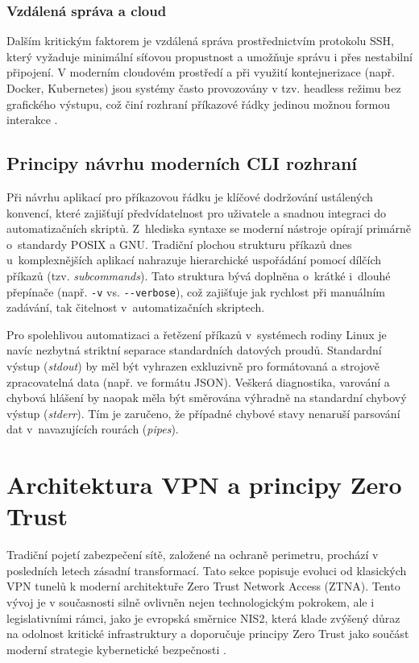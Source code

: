 \subsubsection{Vzdálená správa a cloud}
Dalším kritickým faktorem je vzdálená správa prostřednictvím protokolu SSH, který vyžaduje minimální síťovou propustnost a umožňuje správu i přes nestabilní připojení. V moderním cloudovém prostředí a při využití kontejnerizace (např. Docker, Kubernetes) jsou systémy často provozovány v tzv. headless režimu bez grafického výstupu, což činí rozhraní příkazové řádky jedinou možnou formou interakce \cite{ward_linux}.

\subsection{Principy návrhu moderních CLI rozhraní}

Při návrhu aplikací pro příkazovou řádku je klíčové dodržování ustálených konvencí, které zajišťují předvídatelnost pro uživatele a snadnou integraci do automatizačních skriptů. Z~hlediska syntaxe se moderní nástroje opírají primárně o~standardy POSIX a GNU. Tradiční plochou strukturu příkazů dnes u~komplexnějších aplikací nahrazuje hierarchické uspořádání pomocí dílčích příkazů (tzv. \textit{subcommands}). Tato struktura bývá doplněna o~krátké i~dlouhé přepínače (např. \texttt{-v} vs. \texttt{-{}-verbose}), což zajišťuje jak rychlost při manuálním zadávání, tak čitelnost v~automatizačních skriptech.

Pro spolehlivou automatizaci a řetězení příkazů v~systémech rodiny Linux je navíc nezbytná striktní separace standardních datových proudů. Standardní výstup (\textit{stdout}) by měl být vyhrazen exkluzivně pro formátovaná a strojově zpracovatelná data (např. ve formátu JSON). Veškerá diagnostika, varování a chybová hlášení by naopak měla být směrována výhradně na standardní chybový výstup (\textit{stderr}). Tím je zaručeno, že případné chybové stavy nenaruší parsování dat v~navazujících rourách (\textit{pipes}).

\section{Architektura VPN a principy Zero Trust}
\label{sec:vpn_zero_trust}
Tradiční pojetí zabezpečení sítě, založené na ochraně perimetru, prochází v posledních letech zásadní transformací. Tato sekce popisuje evoluci od klasických VPN tunelů k moderní architektuře Zero Trust Network Access (ZTNA). Tento vývoj je v současnosti silně ovlivněn nejen technologickým pokrokem, ale i legislativními rámci, jako je evropská směrnice NIS2, která klade zvýšený důraz na odolnost kritické infrastruktury a doporučuje principy Zero Trust jako součást moderní strategie kybernetické bezpečnosti \cite{goodaccess_ztna_explained}.

